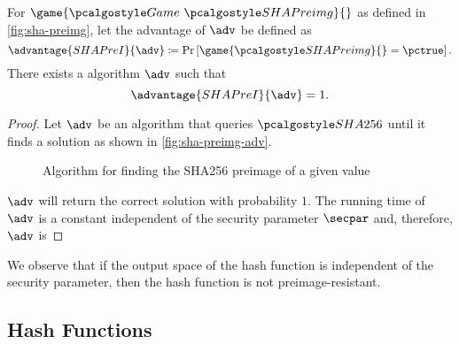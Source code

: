 \begin{proposition}
 For $\game{\Game~\algo{SHAPreimg}}{}$ as defined in \autoref{fig:sha-preimg}, let the advantage of $\adv$ be defined as
 \[
  \advantage{SHAPreI}{\adv} \defeq \pr{\game{\algo{SHAPreimg}}{} = \pctrue}.
 \]
 There exists a \ppt algorithm $\adv$ such that
 \[
 \advantage{SHAPreI}{\adv} = 1.
 \]
\end{proposition}

\begin{proof}
  Let $\adv$ be an algorithm that queries $\algo{SHA256}$ until it finds a solution as shown in \autoref{fig:sha-preimg-adv}.
  \begin{figure}[tbhp]
  \begin{center}
    \begin{tcolorbox}[width=5cm]
      \begin{pchstack}[center]
      \end{pchstack}
    \end{tcolorbox}
  \end{center}
  \caption{Algorithm for finding the SHA256 preimage of a given value \label{fig:sha-preimg-adv}}
  \end{figure}
  $\adv$ will return the correct solution with probability $1$.
  The running time of $\adv$ is a constant independent of the security parameter $\secpar$ and, therefore, $\adv$ is \ppt
\end{proof}


We observe that if the output space of the hash function is independent of the security parameter, then the hash function is not preimage-resistant.

\subsection{Hash Functions}

